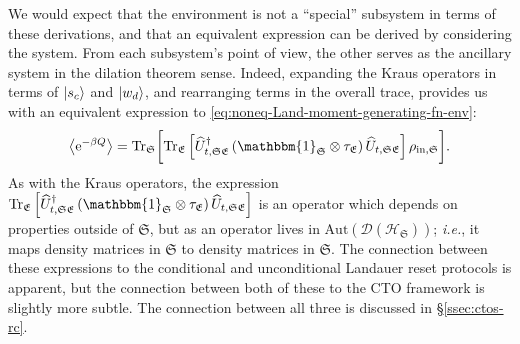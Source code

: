 \documentclass[preprints,article,accept,moreauthors,pdftex]{Definitions/mdpi}
\begin{document}
\begin{paracol}{2}
We would expect that the environment is not a ``special'' subsystem in terms of these derivations, and that an equivalent expression can be derived by considering the system. From each subsystem's point of view, the other serves as the ancillary system in the dilation theorem sense. Indeed, expanding the Kraus operators in terms of $\ket{s_{c}}$ and $\ket{w_{d}}$, and rearranging terms in the overall trace, provides us with an equivalent expression to \eqref{eq:noneq-Land-moment-generating-fn-env}:
\begin{equation}
    \label{eq:noneq-Land-moment-generating-fn-sys}
    \left\langle \mathrm{e}^{-\beta Q}\right\rangle = \mathrm{Tr}_{\mathfrak{S}}\bigg[\mathrm{Tr}_{\mathfrak{E}}\left[\widehat{U}_{t,\mathfrak{SE}}^{\dagger}\left(\mathbbm{1}_{\mathfrak{S}}\otimes\tau_{\mathfrak{E}}\right)\widehat{U}_{t,\mathfrak{SE}}\right]\rho_{\mathrm{in},\mathfrak{S}}\bigg].
\end{equation}
As with the Kraus operators, the expression $\mathrm{Tr}_{\mathfrak{E}}\left[\widehat{U}_{t,\mathfrak{SE}}^{\dagger}\left(\mathbbm{1}_{\mathfrak{S}}\otimes\tau_{\mathfrak{E}}\right)\widehat{U}_{t,\mathfrak{SE}}\right]$ is an operator which depends on properties outside of $\mathfrak{S}$, but as an operator lives in $\mathrm{Aut}\left(\mathcal{D}\left(\mathcal{H}_{\mathfrak{S}}\right)\right)$; \emph{i.e.}, it maps density matrices in $\mathfrak{S}$ to density matrices in $\mathfrak{S}$. The connection between these expressions to the conditional and unconditional Landauer reset protocols is apparent, but the connection between both of these to the CTO framework is slightly more subtle. The connection between all three is discussed in \S\ref{ssec:ctos-rc}.


\end{paracol}
\end{document}
